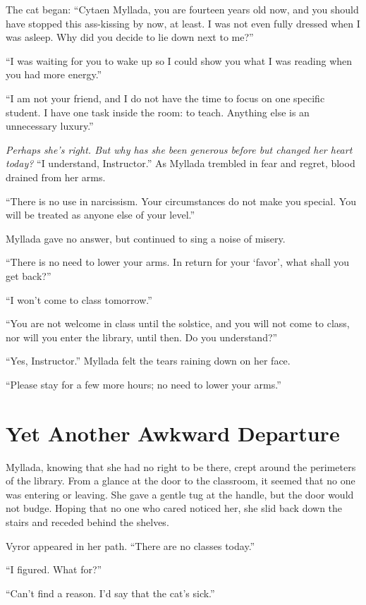 The cat began: ``Cytaen Myllada, you are fourteen years old now, and you should have stopped this ass-kissing by now, at least. I was not even fully dressed when I was asleep. Why did you decide to lie down next to me?''

``I was waiting for you to wake up so I could show you what I was reading when you had more energy.''

``I am not your friend, and I do not have the time to focus on one specific student. I have one task inside the room: to teach. Anything else is an unnecessary luxury.''

\emph{Perhaps she's right. But why has she been generous before but changed her heart today?} ``I understand, Instructor.'' As Myllada trembled in fear and regret, blood drained from her arms.

``There is no use in narcissism. Your circumstances do not make you special. You will be treated as anyone else of your level.''

Myllada gave no answer, but continued to sing a noise of misery.

``There is no need to lower your arms. In return for your `favor', what shall you get back?''

``I won't come to class tomorrow.''

``You are not welcome in class until the solstice, and you will not come to class, nor will you enter the library, until then. Do you understand?''

``Yes, Instructor.'' Myllada felt the tears raining down on her face.

``Please stay for a few more hours; no need to lower your arms.''

\chapter{Yet Another Awkward Departure}

Myllada, knowing that she had no right to be there, crept around the perimeters of the library. From a glance at the door to the classroom, it seemed that no one was entering or leaving. She gave a gentle tug at the handle, but the door would not budge. Hoping that no one who cared noticed her, she slid back down the stairs and receded behind the shelves.

Vyror appeared in her path. ``There are no classes today.''

``I figured. What for?''

``Can't find a reason. I'd say that the cat's sick.''

